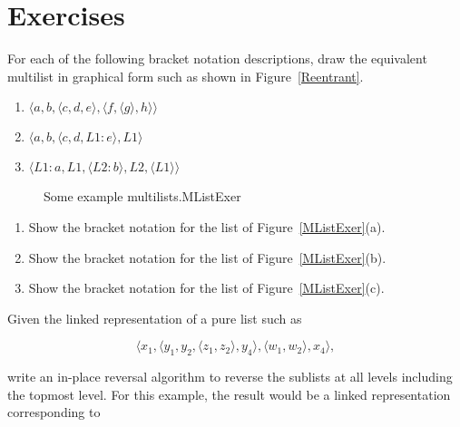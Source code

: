\section{Exercises}

\begin{exercises}

\item
For each of the following bracket notation descriptions,
draw the equivalent multilist in graphical form such as shown in
Figure~\ref{Reentrant}.
\begin{enumerate}
\item
\(\langle a, b, \langle c, d, e\rangle, \langle f, \langle g\rangle,
h\rangle\rangle\)
\item
\(\langle a, b, \langle c, d, L1\!:\!e\rangle, L1\rangle\)

\item
\(\langle L1\!:\!a, L1, \langle L2\!:\!b\rangle, L2, \langle L1
\rangle\rangle\)

\end{enumerate}

\begin{figure}
{Some example multilists.}{MListExer}
\end{figure}

\item
\begin{enumerate}
\item
Show the bracket notation for the list of Figure~\ref{MListExer}(a).
\item
Show the bracket notation for the list of Figure~\ref{MListExer}(b).
\item
Show the bracket notation for the list of Figure~\ref{MListExer}(c).
\end{enumerate}

\item
Given the linked representation of a pure list such as

\vspace{-\bigskipamount}
\[\langle x_1, \langle y_1, y_2, \langle z_1, z_2\rangle, y_4\rangle,
\langle w_1, w_2\rangle, x_4\rangle,\]
\vspace{-\bigskipamount}
\vspace{-\smallskipamount}

\noindent write an in-place reversal algorithm to reverse the sublists
at all levels including the topmost level.
For this example, the result would be a linked
representation corresponding to


\end{exercises}
